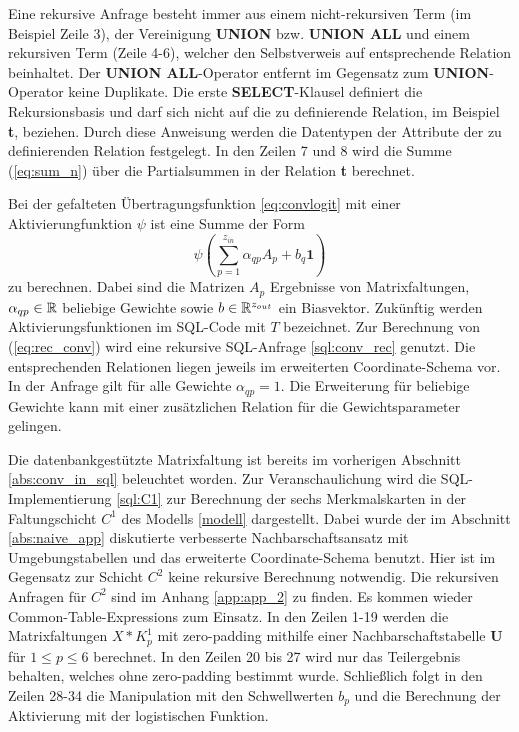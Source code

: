 

Eine rekursive Anfrage besteht immer aus einem nicht-rekursiven Term (im Beispiel Zeile 3), der Vereinigung \textbf{UNION} bzw. \textbf{UNION ALL} und einem rekursiven Term (Zeile 4-6), welcher den Selbstverweis auf entsprechende Relation beinhaltet. Der \textbf{UNION ALL}-Operator entfernt im Gegensatz zum \textbf{UNION}-Operator keine Duplikate. Die erste \textbf{SELECT}-Klausel definiert die Rekursionsbasis und darf sich nicht auf die zu definierende Relation, im Beispiel \textbf{t}, beziehen. Durch diese Anweisung werden die Datentypen der Attribute der zu definierenden Relation festgelegt. In den Zeilen 7 und 8 wird die Summe (\ref{eq:sum_n}) über die Partialsummen in der Relation \textbf{t} berechnet. 

Bei der gefalteten Übertragungsfunktion \ref{eq:convlogit} mit einer Aktivierungfunktion $\psi$ ist eine Summe der Form
\begin{equation}
    \label{eq:rec_conv}
    \psi \left(\sum_{p=1}^{z_{in}} \alpha_{qp} A_p+ b_q \mathbf{1} \right)
\end{equation}
zu berechnen. Dabei sind die Matrizen $A_p$ Ergebnisse von Matrixfaltungen, $\alpha_{qp} \in \mathbb{R}$ beliebige Gewichte sowie $b \in \mathbb{R}^{z_{out}}$ ein Biasvektor. Zukünftig werden Aktivierungsfunktionen im SQL-Code mit $T$ bezeichnet. Zur Berechnung von (\ref{eq:rec_conv}) wird eine rekursive SQL-Anfrage \ref{sql:conv_rec} genutzt. Die entsprechenden Relationen liegen jeweils im erweiterten Coordinate-Schema vor. In der Anfrage gilt für alle Gewichte $\alpha_{qp}=1$. Die Erweiterung für beliebige Gewichte kann mit einer zusätzlichen Relation für die Gewichtsparameter gelingen. 



Die datenbankgestützte Matrixfaltung ist bereits im vorherigen Abschnitt \ref{abs:conv_in_sql} beleuchtet worden. Zur Veranschaulichung wird die SQL-Implementierung \ref{sql:C1} zur Berechnung der sechs Merkmalskarten in der Faltungschicht $C^1$ des Modells \ref{modell} dargestellt. Dabei wurde der im Abschnitt \ref{abs:naive_app} diskutierte verbesserte Nachbarschaftsansatz mit Umgebungstabellen und das erweiterte Coordinate-Schema benutzt. Hier ist im Gegensatz zur Schicht $C^2$ keine rekursive Berechnung notwendig. Die rekursiven Anfragen für $C^2$ sind im Anhang \ref{app:app_2} zu finden. Es kommen wieder Common-Table-Expressions zum Einsatz. In den Zeilen 1-19 werden die Matrixfaltungen $X \ast K^{1}_p$ mit zero-padding mithilfe einer Nachbarschaftstabelle \textbf{U} für $1 \leq p \leq 6$ berechnet. In den Zeilen 20 bis 27 wird nur das Teilergebnis behalten, welches ohne zero-padding bestimmt wurde. Schließlich folgt in den Zeilen 28-34 die Manipulation mit den Schwellwerten $b_p$ und die Berechnung der Aktivierung mit der logistischen Funktion.

